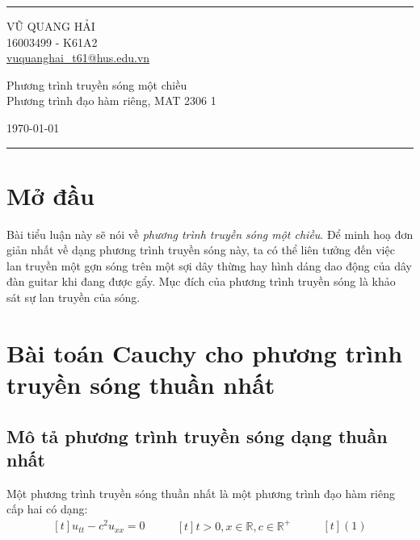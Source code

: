\documentclass[a4paper]{article}
\begin{document}

\fancyhead[C]{}
\hrule \medskip %
\begin{minipage}{0.295\textwidth} 
\raggedright
\footnotesize
VŨ QUANG HẢI \hfill\\
16003499 - K61A2\hfill\\
\href{mailto: vuquanghai_t61@hus.edu.vn}{vuquanghai\_t61@hus.edu.vn}
\end{minipage}
\begin{minipage}{0.4\textwidth}
\centering 
\large 
Phương trình truyền sóng một chiều \\ 
\normalsize 
Phương trình đạo hàm riêng, MAT 2306 1 \\ 
\end{minipage}
\begin{minipage}{0.295\textwidth} 
\raggedleft
\today\hfill\\
\end{minipage}
\medskip\hrule 
\bigskip


\section{Mở đầu}
Bài tiểu luận này sẽ nói về \emph{phương trình truyền sóng một chiều}. Để minh hoạ đơn giản nhất về dạng phương trình truyền sóng này, ta có thể liên tưởng đến việc lan truyền một gợn sóng trên một sợi dây thừng hay hình dáng dao động của dây đàn guitar khi đang được gẩy. Mục đích của phương trình truyền sóng là khảo sát sự lan truyền của sóng.

\section{Bài toán Cauchy cho phương trình truyền sóng thuần nhất}
\subsection{Mô tả phương trình truyền sóng dạng thuần nhất}

Một phương trình truyền sóng thuần nhất là một phương trình đạo hàm riêng cấp hai có dạng:
\begin{equation*}
\begin{aligned}[t]
u_{tt} - c^2u_{xx} = 0
\end{aligned}
\qquad
\begin{aligned}[t]
t > 0, x \in \mathbb{R}, c \in \mathbb{R}^+
\end{aligned}
\qquad
\begin{aligned}[t]
(1)
\end{aligned}
\end{equation*}
\end{document}
